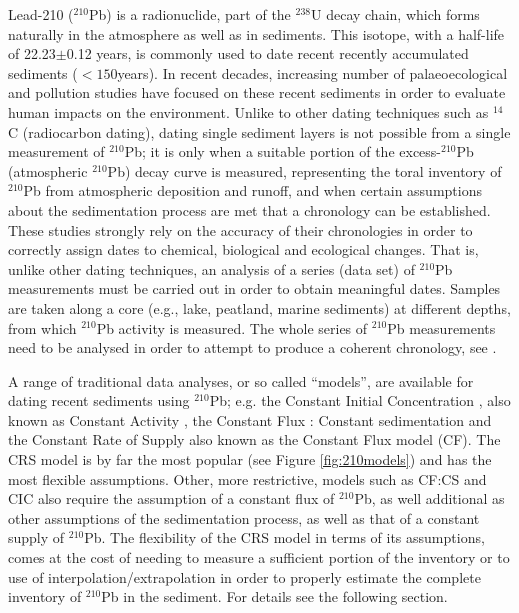 \documentclass [10pt] {article}
\begin{document}
Lead-210 ($^{210}$Pb) is a radionuclide, part of the $^{238}$U decay chain, which forms naturally in the atmosphere as well as in sediments.
This isotope, with a half-life of 22.23$\pm$0.12 years, is commonly used to date recent recently accumulated sediments ($<150$years). 
In recent decades, increasing number of palaeoecological and pollution studies have focused on these recent sediments \citep[e.g.,][]{Courtney2019} in order to evaluate human impacts on the environment.
Unlike to other dating techniques such as $^{14}$C (radiocarbon dating), dating single sediment layers is not possible from a single measurement of $^{210}$Pb; it is only when a suitable portion of the excess-$^{210}$Pb (atmospheric $^{210}$Pb) decay curve is measured, representing the toral inventory of $^{210}$Pb from atmospheric deposition and runoff, and when certain assumptions about the sedimentation process are met that a chronology can be established.  
These studies strongly rely on the accuracy of their chronologies in order to correctly assign dates to chemical, biological and ecological changes.
That is, unlike other dating techniques, an analysis of a series (data set) of $^{210}$Pb measurements must be carried out in order to obtain meaningful dates.  Samples are taken along a core (e.g., lake, peatland, marine sediments) at different depths, from which $^{210}$Pb activity is measured.  
The whole series of $^{210}$Pb measurements need to be analysed in order to attempt to produce a coherent chronology, see \citet{Aquino2018}.

A range of traditional data analyses, or so called ``models'', are available for dating recent sediments using $^{210}$Pb; e.g. the Constant Initial Concentration \citep[CIC,][]{Goldberg1963}, also known as Constant Activity \citep[CA,][]{Robbins1975}, the Constant Flux : Constant sedimentation \citep[CF:CS,][]{Crozaz1964} and the Constant Rate of Supply  \citep[CRS,][]{Appleby1978,Robbins1978,Sanchez-Cabeza2012} also known as the Constant Flux model (CF). 
The CRS model is by far the most popular (see Figure \ref{fig:210models}) and has the most flexible assumptions.
Other, more restrictive, models such as CF:CS and CIC also require the assumption of a constant flux of $^{210}$Pb, as well additional as other assumptions of the sedimentation process, as well as that of a constant supply of $^{210}$Pb.
The flexibility of the CRS model in terms of its assumptions, comes at the cost of needing to measure a sufficient portion of the inventory or to use of interpolation/extrapolation in order to properly estimate the complete inventory of $^{210}$Pb in the sediment. 
For details see the following section.
\end{document}
